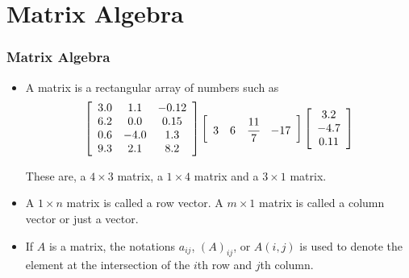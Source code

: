 \documentclass[notheorems,mathserif,table,compress]{beamer}  %
\begin{document}
\section{Matrix Algebra}

\begin{frame}
\frametitle{Matrix Algebra}
\begin{itemize}
\item A matrix is a rectangular array of numbers such as
\begin{displaymath}
\left[\begin{array}{ccc}
3.0 & 1.1 & -0.12 \\
6.2 & 0.0 &  0.15\\
0.6 & -4.0 & 1.3\\
9.3 & 2.1 & 8.2 \\
\end{array} \right]
\left[\begin{array}{cccc}
3 & 6 & \cfrac{11}{7} & -17 
\end{array} \right]
\left[\begin{array}{ccc}
3.2\\
-4.7\\
0.11
\end{array} \right]
\end{displaymath}

These are, a $4\times3$ matrix, a $1\times4$ matrix and a $3\times1$ matrix. 
\end{itemize}

\begin{itemize}
\item A $1\times n$ matrix is called a \textsf{row vector}. A $m\times 1$ matrix is called a \textsf{column vector} or just a \textsf{vector}.
\end{itemize}
\begin{itemize}
\item If $A$ is a matrix, the notations $a_{ij}$, $(A)_{ij}$, or $A(i,j)$ is used to denote the element at the intersection of the $i$th row and $j$th column. 
\end{itemize}
\end{frame}
\end{document}
